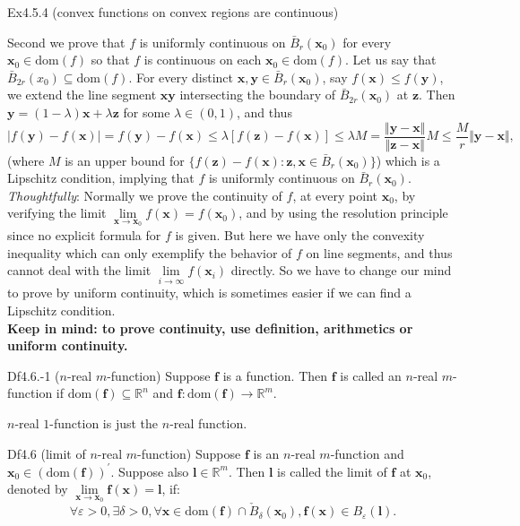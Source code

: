 \documentclass{article}
\begin{document}
\begin{Th}{Ex4.5.4 (convex functions on convex regions are continuous)}
\begin{compactenum}
    \end{compactenum}
    Second we prove that $f$ is uniformly continuous on $\bar{B}_r(\pmb{x}_0)$ for every $\pmb{x}_0\in\text{dom}(f)$ so that $f$ is continuous on each $\pmb{x}_0\in\text{dom}(f)$. Let us say that $\bar{B}_{2r}(x_0)\subseteq\text{dom}(f)$. For every distinct $\pmb{x}, \pmb{y}\in \bar{B}_r(\pmb{x}_0)$, say $f(\pmb{x})\leq f(\pmb{y})$, we extend the line segment $\pmb{x}\pmb{y}$ intersecting the boundary of $\bar{B}_{2r}(\pmb{x}_0)$ at $\pmb{z}$. Then $\pmb{y} = (1-\lambda)\pmb{x}+\lambda\pmb{z}$ for some $\lambda\in(0,1)$, and thus
    $$ |f(\pmb{y}) - f(\pmb{x})| = f(\pmb{y}) - f(\pmb{x}) \leq \lambda [f(\pmb{z})-f(\pmb{x})] \leq \lambda M = \frac{\Vert\pmb{y}-\pmb{x}\Vert}{\Vert\pmb{z}-\pmb{x}\Vert}M\leq \frac{M}{r}\Vert\pmb{y}-\pmb{x}\Vert, $$
    (where $M$ is an upper bound for $\{f(\pmb{z}) - f(\pmb{x}): \pmb{z}, \pmb{x}\in\bar{B}_r(\pmb{x}_0)\}$) which is a Lipschitz condition, implying that $f$ is uniformly continuous on $\bar{B}_r(\pmb{x}_0)$.\\
    \textcolor{P}{\textit{Thoughtfully}: Normally we prove the continuity of $f$, at every point $\pmb{x}_0$, by verifying the limit $\lim\limits_{\pmb{x}\to\pmb{x}_0} f(\pmb{x}) = f(\pmb{x}_0)$, and by using the resolution principle since no explicit formula for $f$ is given. But here we have only the convexity inequality which can only exemplify the behavior of $f$ on line segments, and thus cannot deal with the limit $\lim\limits_{i\to \infty} f(\pmb{x}_i)$ directly. So we have to change our mind to prove by uniform continuity, which is sometimes easier if we can find a Lipschitz condition.\\
    \textbf{Keep in mind: to prove continuity, use definition, arithmetics or uniform continuity.}}
\end{Th}

\begin{Df}{Df4.6.-1 ($n$-real $m$-function)}
    Suppose $\pmb{f}$ is a function. Then $\pmb{f}$ is called an $n$-real $m$-function if $\text{dom}(\pmb{f})\subseteq\mathbb{R}^n$ and $\pmb{f}: \text{dom}(\pmb{f})\rightarrow\mathbb{R}^m$.
\end{Df}

\begin{Rmk}{}
    $n$-real $1$-function is just the $n$-real function.
\end{Rmk}

\begin{Df}{Df4.6 (limit of $n$-real $m$-function)}
    Suppose $\pmb{f}$ is an $n$-real $m$-function and $\pmb{x}_0\in(\text{dom}(\pmb{f}))^\prime$. Suppose also $\pmb{l}\in\mathbb{R}^m$. Then $\pmb{l}$ is called the limit of $\pmb{f}$ at $\pmb{x}_0$, denoted by $\lim\limits_{\pmb{x}\to\pmb{x}_0}\pmb{f}(\pmb{x}) = \pmb{l}$, if:
    $$ \forall\varepsilon>0, \exists\delta>0, \forall\pmb{x}\in\text{dom}(\pmb{f})\cap \check{B}_\delta(\pmb{x}_0), \pmb{f}(\pmb{x})\in B_\varepsilon(\pmb{l}). $$
\end{Df}
\end{document}
